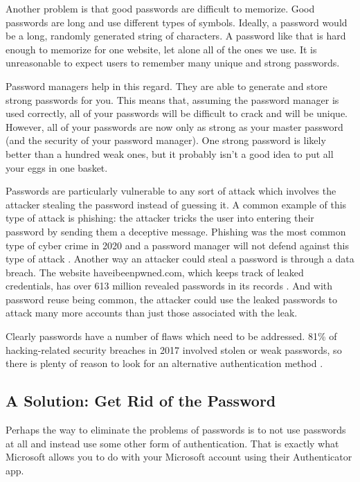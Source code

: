 \documentclass[12pt, letterpaper]{article}
\begin{document}
Another problem is that good passwords are difficult to memorize.
Good passwords are long and use different types of symbols.
Ideally, a password would be a long, randomly generated string of characters.
A password like that is hard enough to memorize for one website, let alone all of the ones we use.
It is unreasonable to expect users to remember many unique and strong passwords.

Password managers help in this regard.
They are able to generate and store strong passwords for you.
This means that, assuming the password manager is used correctly, all of your passwords will be difficult to crack and will be unique. 
However, all of your passwords are now only as strong as your master password (and the security of your password manager).
One strong password is likely better than a hundred weak ones, but it probably isn't a good idea to put all your eggs in one basket.

Passwords are particularly vulnerable to any sort of attack which involves the attacker stealing the password instead of guessing it.
A common example of this type of attack is phishing: the attacker tricks the user into entering their password by sending them a deceptive message.
Phishing was the most common type of cyber crime in 2020 and a password manager will not defend against this type of attack \parencite{fbi2020icr}.
Another way an attacker could steal a password is through a data breach.
The website haveibeenpwned.com, which keeps track of leaked credentials, has over 613 million revealed passwords in its records \parencite{hibpweb}.
And with password reuse being common, the attacker could use the leaked passwords to attack many more accounts than just those associated with the leak.

Clearly passwords have a number of flaws which need to be addressed.
81\% of hacking-related security breaches in 2017 involved stolen or weak passwords, so there is plenty of reason to look for an alternative authentication method \parencite{verizon2017dbir}.

\subsection{A Solution: Get Rid of the Password}
Perhaps the way to eliminate the problems of passwords is to not use passwords at all and instead use some other form of authentication.
That is exactly what Microsoft allows you to do with your Microsoft account using their Authenticator app. 
\end{document}
